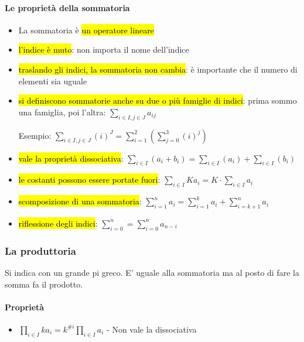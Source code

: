 \documentclass[a4paper,12pt,oneside]{article}
\begin{document}
\paragraph{Le proprietà della sommatoria} 
\begin{itemize}
    \item La sommatoria è \hl{un operatore lineare}
    \item \hl{l'indice è muto}: non importa il nome dell'indice 
    \item \hl{traslando gli indici, la sommatoria non cambia}: è importante 
        che il numero di elementi sia uguale
    \item \hl{si definiscono sommatorie anche su due o più famiglie di 
        indici}: prima sommo una famiglia, poi l'altra: $\sum_{i \in I, j \in J} a_{ij}$
        
        Esempio: $\sum_{i \in I, j \in J} (i)^J = \sum_{i=1}^{2} (\sum_{j=0}^{3} (i)^j)$
    \item \hl{vale la proprietà dissociativa}:
        $\sum_{i \in I} (a_i + b_i) = \sum_{i \in I} (a_i) + \sum_{i \in I} (b_i)$
    \item \hl{le costanti possono essere portate fuori}:
        $\sum_{i \in I} Ka_i = K\cdot\sum_{i \in I} a_i$
    \item \hl{scomposizione di una sommatoria}:
        $\sum_{i=1}^n a_i = \sum_{i=1}^k a_i + \sum_{i=k+1}^n a_i$
    \item \hl{riflessione degli indici}:
        $\sum_{i=0}^n = \sum_{i=0}^n a_{n-i}$
\end{itemize}

\subsubsection{La produttoria}
Si indica con un grande pi greco. E' uguale alla sommatoria ma al posto di
fare la somma fa il prodotto.

\paragraph{Proprietà}
\begin{itemize}
    \item $\prod_{i \in I} ka_i = k^{\#i}\prod_{i \in I} a_i$
    - Non vale la dissociativa
\end{itemize}
\end{document}
